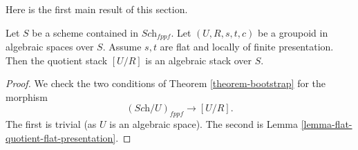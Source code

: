 \noindent
Here is the first main result of this section.

\begin{theorem}
\label{theorem-flat-groupoid-gives-algebraic-stack}
Let $S$ be a scheme contained in $\textit{Sch}_{fppf}$.
Let $(U, R, s, t, c)$ be a groupoid in algebraic spaces over $S$.
Assume $s, t$ are flat and locally of finite presentation.
Then the quotient stack $[U/R]$ is an algebraic stack over $S$.
\end{theorem}

\begin{proof}
We check the two conditions of
Theorem \ref{theorem-bootstrap}
for the morphism
$$
(\textit{Sch}/U)_{fppf} \longrightarrow [U/R].
$$
The first is trivial (as $U$ is an algebraic space).
The second is
Lemma \ref{lemma-flat-quotient-flat-presentation}.
\end{proof}


















